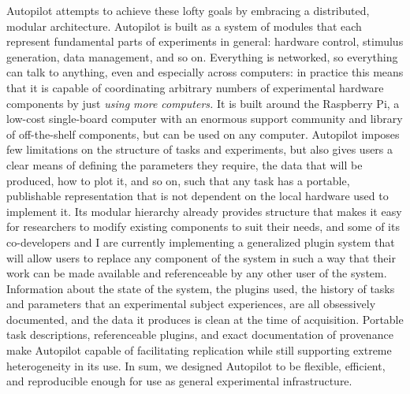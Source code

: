 \documentclass{article}
\begin{document}
Autopilot attempts to achieve these lofty goals by embracing a
distributed, modular architecture. Autopilot is built as a system of
modules that each represent fundamental parts of experiments in general:
hardware control, stimulus generation, data management, and so on.
Everything is networked, so everything can talk to anything, even and
especially across computers: in practice this means that it is capable
of coordinating arbitrary numbers of experimental hardware components by
just \emph{using more computers.} It is built around the Raspberry Pi, a
low-cost single-board computer with an enormous support community and
library of off-the-shelf components, but can be used on any computer.
Autopilot imposes few limitations on the structure of tasks and
experiments, but also gives users a clear means of defining the
parameters they require, the data that will be produced, how to plot it,
and so on, such that any task has a portable, publishable representation
that is not dependent on the local hardware used to implement it. Its
modular hierarchy already provides structure that makes it easy for
researchers to modify existing components to suit their needs, and some
of its co-developers and I are currently implementing a generalized
plugin system that will allow users to replace any component of the
system in such a way that their work can be made available and
referenceable by any other user of the system. Information about the
state of the system, the plugins used, the history of tasks and
parameters that an experimental subject experiences, are all obsessively
documented, and the data it produces is clean at the time of
acquisition. Portable task descriptions, referenceable plugins, and
exact documentation of provenance make Autopilot capable of facilitating
replication while still supporting extreme heterogeneity in its use. In
sum, we designed Autopilot to be flexible, efficient, and reproducible
enough for use as general experimental infrastructure.
\end{document}
